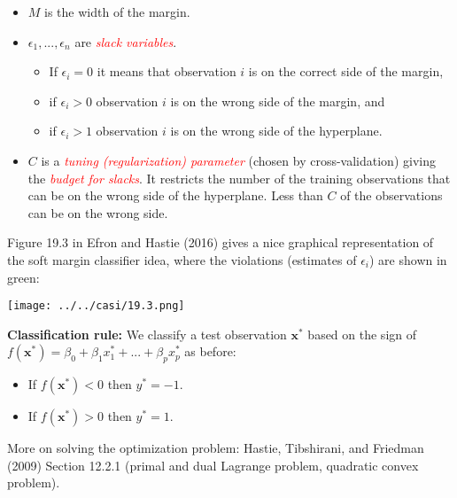\documentclass[10pt,ignorenonframetext,]{beamer}
\providecommand{\tightlist}{%
  \setlength{\itemsep}{0pt}\setlength{\parskip}{0pt}}
\begin{document}
\begin{frame}

\begin{itemize}
\item
  \(M\) is the width of the margin.
\item
  \(\epsilon_1,...,\epsilon_n\) are
  \emph{\textcolor{red}{slack variables}}.

  \begin{itemize}
  \tightlist
  \item
    If \(\epsilon_i=0\) it means that observation \(i\) is on the
    correct side of the margin,
  \item
    if \(\epsilon_i>0\) observation \(i\) is on the wrong side of the
    margin, and
  \item
    if \(\epsilon_i>1\) observation \(i\) is on the wrong side of the
    hyperplane.
  \end{itemize}
\item
  \(C\) is a \emph{\textcolor{red}{tuning (regularization) parameter}}
  (chosen by cross-validation) giving the
  \emph{\textcolor{red}{budget for slacks}}. It restricts the number of
  the training observations that can be on the wrong side of the
  hyperplane. Less than \(C\) of the observations can be on the wrong
  side.
\end{itemize}

\end{frame}

\begin{frame}

Figure 19.3 in Efron and Hastie (2016) gives a nice graphical
representation of the soft margin classifier idea, where the violations
(estimates of \(\epsilon_i\)) are shown in green:

\centering

\texttt{[image: ../../casi/19.3.png]}

\end{frame}

\begin{frame}

\textbf{Classification rule:} We classify a test observation
\({\boldsymbol x}^*\) based on the sign of
\(f({\boldsymbol x}^*)=\beta_0+\beta_1 x_1^*+...+\beta_p x_p^*\) as
before:

\begin{itemize}
\tightlist
\item
  If \(f({\boldsymbol x}^*)<0\) then \(y^*=-1\).
\item
  If \(f({\boldsymbol x}^*)>0\) then \(y^*=1\).
\end{itemize}

\vspace{3mm}

More on solving the optimization problem: Hastie, Tibshirani, and
Friedman (2009) Section 12.2.1 (primal and dual Lagrange problem,
quadratic convex problem).

\end{frame}
\end{document}
